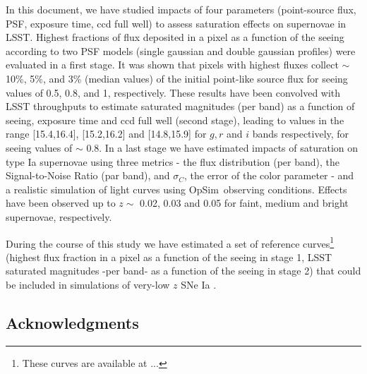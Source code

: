 \documentclass[\docopts]{\docclass}
\newcommand{\sne}{{SNe Ia }}
\newcommand{\opsim}{{\sc OpSim}}
\newcommand{\colorerr}{{$\sigma_C$}}
\begin{document}
In this document, we have studied impacts of four parameters (point-source flux, PSF, exposure time, ccd full well) to assess saturation effects on supernovae in LSST. Highest fractions of flux deposited in a pixel as a function of the seeing according to two PSF models (single gaussian and double gaussian profiles) were evaluated in a first stage. It was shown that pixels with highest fluxes collect $\sim$ 10\%, 5\%, and 3\% (median values) of the initial point-like source flux for seeing values of 0.5\arcsec, 0.8\arcsec, and 1\arcsec,  respectively.  These results have been convolved with LSST throughputs to estimate saturated magnitudes (per band) as a function of seeing, exposure time and ccd full well (second stage), leading to values in the range [15.4,16.4], [15.2,16.2] and [14.8,15.9] for $g,r$ and $i$ bands respectively, for seeing values of $\sim$ 0.8\arcsec. In a last stage we have estimated impacts of saturation on type Ia supernovae using three metrics - the flux distribution (per band), the Signal-to-Noise Ratio (par band), and \colorerr, the error of the color parameter - and a realistic simulation of light curves using \opsim~observing conditions. Effects have been observed up to $z\sim$ 0.02, 0.03 and 0.05 for faint, medium and bright supernovae, respectively.

During the course of this study we have estimated a set of reference curves\footnote{These curves are available at ...} (highest flux fraction in a pixel as a function of the seeing in stage 1, LSST saturated magnitudes -per band- as a function of the seeing in stage 2) that could be included in simulations of very-low $z$ \sne. 



\subsection*{Acknowledgments}



\end{document}
